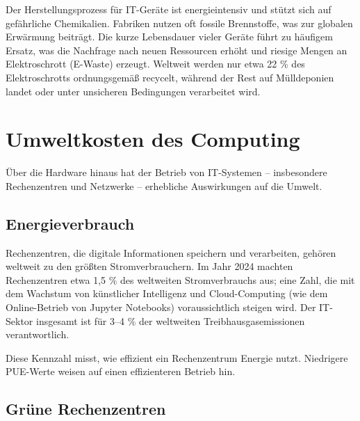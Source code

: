 \documentclass[
  nswissgerman,
  a4paper,
  DIV=11,
  numbers=noendperiod,
  ngerman]{scrreprt}
\begin{document}
Der Herstellungsprozess für IT-Geräte ist energieintensiv und stützt
sich auf gefährliche Chemikalien. Fabriken nutzen oft fossile
Brennstoffe, was zur globalen Erwärmung beiträgt. Die kurze Lebensdauer
vieler Geräte führt zu häufigem Ersatz, was die Nachfrage nach neuen
Ressourcen erhöht und riesige Mengen an Elektroschrott (E-Waste)
erzeugt. Weltweit werden nur etwa 22 \% des Elektroschrotts
ordnungsgemäß recycelt, während der Rest auf Mülldeponien landet oder
unter unsicheren Bedingungen verarbeitet wird.

\section{Umweltkosten des Computing}\label{umweltkosten-des-computing}

Über die Hardware hinaus hat der Betrieb von IT-Systemen -- insbesondere
Rechenzentren und Netzwerke -- erhebliche Auswirkungen auf die Umwelt.

\subsection{Energieverbrauch}\label{energieverbrauch}

Rechenzentren, die digitale Informationen speichern und verarbeiten,
gehören weltweit zu den größten Stromverbrauchern. Im Jahr 2024 machten
Rechenzentren etwa 1,5 \% des weltweiten Stromverbrauchs aus; eine Zahl,
die mit dem Wachstum von künstlicher Intelligenz und Cloud-Computing
(wie dem Online-Betrieb von Jupyter Notebooks) voraussichtlich steigen
wird. Der IT-Sektor insgesamt ist für 3--4 \% der weltweiten
Treibhausgasemissionen verantwortlich.

\begin{tcolorbox}[enhanced jigsaw, arc=.35mm, bottomrule=.15mm, bottomtitle=1mm, breakable, colback=white, colbacktitle=quarto-callout-tip-color!10!white, colframe=quarto-callout-tip-color-frame, coltitle=black, left=2mm, leftrule=.75mm, opacityback=0, opacitybacktitle=0.6, rightrule=.15mm, title=\textcolor{quarto-callout-tip-color}{\faLightbulb}\hspace{0.5em}{Power Usage Effectiveness (PUE)}, titlerule=0mm, toprule=.15mm, toptitle=1mm]

Diese Kennzahl misst, wie effizient ein Rechenzentrum Energie nutzt.
Niedrigere PUE-Werte weisen auf einen effizienteren Betrieb hin.

\end{tcolorbox}

\subsection{Grüne Rechenzentren}\label{gruxfcne-rechenzentren}
\end{document}
